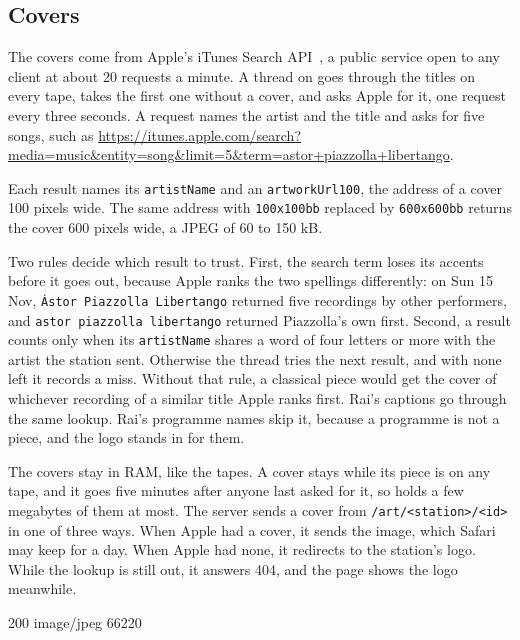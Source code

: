 \documentclass[11pt,a4paper]{article}
\begin{document}
\subsection*{Covers}

The covers come from Apple's iTunes Search API~\cite{itunes}, a public service open to any client at about 20 requests a minute. A thread on  goes through the titles on every tape, takes the first one without a cover, and asks Apple for it, one request every three seconds. A request names the artist and the title and asks for five songs, such as \url{https://itunes.apple.com/search?media=music&entity=song&limit=5&term=astor+piazzolla+libertango}.

Each result names its \texttt{artistName} and an \texttt{artworkUrl100}, the address of a cover 100 pixels wide. The same address with \texttt{100x100bb} replaced by \texttt{600x600bb} returns the cover 600 pixels wide, a JPEG of 60 to 150 kB.

Two rules decide which result to trust. First, the search term loses its accents before it goes out, because Apple ranks the two spellings differently: on Sun 15 Nov, \texttt{Ástor Piazzolla Libertango} returned five recordings by other performers, and \texttt{astor piazzolla libertango} returned Piazzolla's own first. Second, a result counts only when its \texttt{artistName} shares a word of four letters or more with the artist the station sent. Otherwise the thread tries the next result, and with none left it records a miss. Without that rule, a classical piece would get the cover of whichever recording of a similar title Apple ranks first. Rai's captions go through the same lookup. Rai's programme names skip it, because a programme is not a piece, and the logo stands in for them.

The covers stay in RAM, like the tapes. A cover stays while its piece is on any tape, and it goes five minutes after anyone last asked for it, so  holds a few megabytes of them at most. The server sends a cover from \texttt{/art/<station>/<id>} in one of three ways. When Apple had a cover, it sends the image, which Safari may keep for a day. When Apple had none, it redirects to the station's logo. While the lookup is still out, it answers 404, and the page shows the logo meanwhile.

\begin{cmdout}
200 image/jpeg 66220
\end{cmdout}
\end{document}
